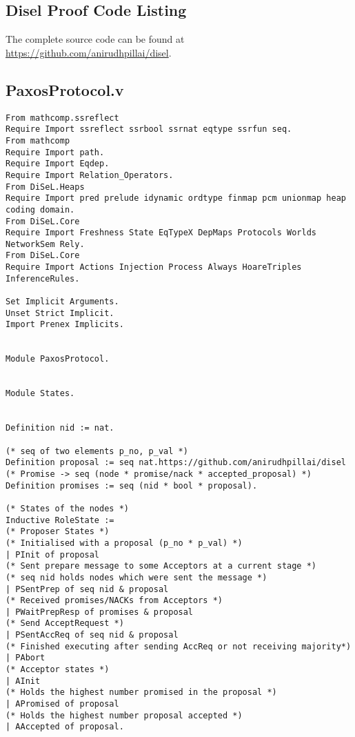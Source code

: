 \begin{landscape}

\chapter{Disel Proof Code Listing}

The complete source code can be found at
\href{https://github.com/anirudhpillai/disel}{https://github.com/anirudhpillai/disel}.

\iffalse
\section{PaxosProtocol.v}
\begin{multicols*}{2}
\begin{lstlisting}[style=SourceCodeListing]
From mathcomp.ssreflect
Require Import ssreflect ssrbool ssrnat eqtype ssrfun seq.
From mathcomp
Require Import path.
Require Import Eqdep.
Require Import Relation_Operators.
From DiSeL.Heaps
Require Import pred prelude idynamic ordtype finmap pcm unionmap heap coding domain.
From DiSeL.Core
Require Import Freshness State EqTypeX DepMaps Protocols Worlds NetworkSem Rely.
From DiSeL.Core
Require Import Actions Injection Process Always HoareTriples InferenceRules.

Set Implicit Arguments.
Unset Strict Implicit.
Import Prenex Implicits.


Module PaxosProtocol.


Module States.


Definition nid := nat.

(* seq of two elements p_no, p_val *)
Definition proposal := seq nat.https://github.com/anirudhpillai/disel
(* Promise -> seq (node * promise/nack * accepted_proposal) *)
Definition promises := seq (nid * bool * proposal).

(* States of the nodes *)
Inductive RoleState :=
(* Proposer States *)
(* Initialised with a proposal (p_no * p_val) *)
| PInit of proposal
(* Sent prepare message to some Acceptors at a current stage *)
(* seq nid holds nodes which were sent the message *)
| PSentPrep of seq nid & proposal
(* Received promises/NACKs from Acceptors *)
| PWaitPrepResp of promises & proposal
(* Send AcceptRequest *)
| PSentAccReq of seq nid & proposal
(* Finished executing after sending AccReq or not receiving majority*)
| PAbort
(* Acceptor states *)
| AInit
(* Holds the highest number promised in the proposal *)
| APromised of proposal
(* Holds the highest number proposal accepted *)
| AAccepted of proposal.


\end{lstlisting}
\end{multicols*}
\end{landscape}
